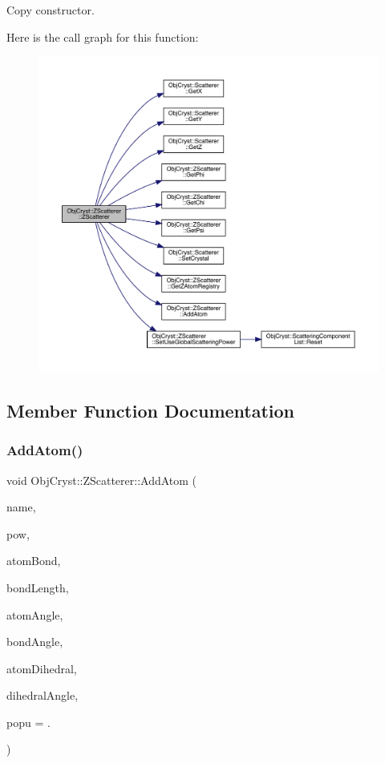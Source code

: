 Copy constructor. 

Here is the call graph for this function\+:
\nopagebreak
\begin{figure}[H]
\begin{center}
\leavevmode
\includegraphics[width=350pt]{class_obj_cryst_1_1_z_scatterer_aa371bd36d61fe7200753cd3a3e1076c8_cgraph}
\end{center}
\end{figure}


\subsection{Member Function Documentation}
\mbox{\label{class_obj_cryst_1_1_z_scatterer_abe2114dff3bb1a170b4a0a855ba8bafa}} 
\subsubsection{\texorpdfstring{AddAtom()}{AddAtom()}}
{\footnotesize\ttfamily void Obj\+Cryst\+::\+Z\+Scatterer\+::\+Add\+Atom (\begin{DoxyParamCaption}\item[{const string \&}]{name,  }\item[{const \mbox{\hyperlink{class_obj_cryst_1_1_scattering_power}{Scattering\+Power}} $\ast$}]{pow,  }\item[{const long}]{atom\+Bond,  }\item[{const R\+E\+AL}]{bond\+Length,  }\item[{const long}]{atom\+Angle,  }\item[{const R\+E\+AL}]{bond\+Angle,  }\item[{const long}]{atom\+Dihedral,  }\item[{const R\+E\+AL}]{dihedral\+Angle,  }\item[{const R\+E\+AL}]{popu = {.} }\end{DoxyParamCaption})}

